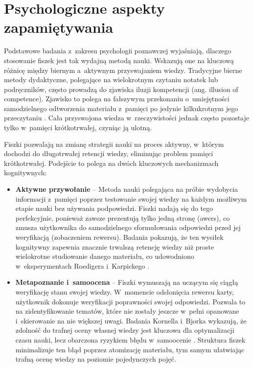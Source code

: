 \section{Psychologiczne aspekty zapamiętywania}
Podstawowe badania z~zakresu psychologii poznawczej wyjaśniają, dlaczego stosowanie fiszek jest tak wydajną metodą nauki.
Wskazują one na kluczową różnicę między biernym a~aktywnym przyswajaniem wiedzy. Tradycyjne bierne metody dydaktyczne, polegające na 
wielokrotnym czytaniu notatek lub podręczników, często prowadzą do zjawiska iluzji kompetencji (ang. illusion of competence). 
Zjawisko to polega na fałszywym przekonaniu o~umiejętności samodzielnego odtworzenia materiału z~pamięci po jedynie kilkukrotnym 
jego przeczytaniu \cite{brown2014make}. Cała przyswojona wiedza w~rzeczywistości jednak często pozostaje tylko w~pamięci krótkotrwałej, czyniąc ją ulotną.

Fiszki pozwalają na zmianę strategii nauki na proces aktywny, w~którym dochodzi do długotrwałej retencji wiedzy, eliminując problem 
pamięci krótkotrwałej. Podejście to polega na dwóch kluczowych mechanizmach kognitywnych:
\begin{itemize}
    \item \textbf{Aktywne przywołanie} -- Metoda nauki polegająca na próbie wydobycia informacji z~pamięci poprzez testowanie swojej 
    wiedzy na każdym możliwym etapie nauki bez używania podpowiedzi. Fiszki nadają się do tego perfekcyjnie, ponieważ zawsze prezentują 
    tylko jedną stronę (awers), co zmusza użytkownika do samodzielnego sformułowania odpowiedzi przed jej weryfikacją (zobaczeniem rewersu).
    Badania pokazują, że ten wysiłek kognitywny zapewnia znacznie trwalszą retencję wiedzy niż proste wielokrotne studiowanie danego 
    materiału, co udowodniono w~eksperymentach Roedigera i~Karpickego \cite{roediger2006test}.
    \item \textbf{Metapoznanie i~samoocena} -- Fiszki wymuszają na uczącym się ciągłą weryfikację stanu swojej wiedzy. W~momencie 
    odsłonięcia rewersu karty, użytkownik dokonuje weryfikacji poprawności swojej odpowiedzi. Pozwala to na zidentyfikowanie 
    tematów, które nie zostały jeszcze w~pełni opanowane i~skierowanie na nie większej uwagi. Badania Kornella i~Bjorka 
    wykazują, że zdolność do trafnej oceny własnej wiedzy jest kluczowa dla optymalizacji czasu nauki, lecz obarczona 
    ryzykiem błędu w~samoocenie \cite{kornell2008optimizing}. Struktura fiszek minimalizuje ten błąd poprzez atomizację 
    materiału, tym samym ułatwiając trafną ocenę wiedzy na poziomie pojedynczych pojęć.
\end{itemize}

